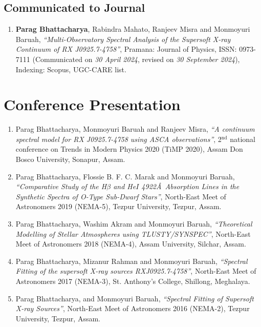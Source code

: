     	\subsection{Communicated to Journal}
    		\begin{enumerate}
    			\item \textbf{Parag Bhattacharya}, Rabindra Mahato, Ranjeev Misra and Monmoyuri Baruah, \textit{``Multi-Observatory Spectral Analysis of the Supersoft X-ray Continuum of RX J0925.7-4758''}, Pramana: Journal of Physics, ISSN: 0973-7111 (Communicated on \textit{30 April 2024}, revised on \textit{30 September 2024}), Indexing: Scopus, UGC-CARE list. \label{paper-pram}
    		\end{enumerate}
    
    \section{Conference Presentation}
        \begin{enumerate}
            \item Parag Bhattacharya, Monmoyuri Baruah and Ranjeev Misra, \textit{``A continuum spectral model for RX J0925.7-4758 using ASCA observations''}, 2$^{\text{nd}}$ national conference on Trends in Modern Physics 2020 (TiMP 2020), Assam Don Bosco University, Sonapur, Assam.
            
            \item Parag Bhattacharya, Flossie B. F. C. Marak and Monmoyuri Baruah, \textit{``Comparative Study of the H$\beta$ and He$I$ 4922\AA\ Absorption Lines in the Synthetic Spectra of O-Type Sub-Dwarf Stars''}, North-East Meet of Astronomers 2019 (NEMA-5), Tezpur University, Tezpur, Assam.
            
            \item Parag Bhattacharya, Washim Akram and Monmoyuri Baruah, \textit{``Theoretical Modelling of Stellar Atmospheres using TLUSTY/SYNSPEC''}, North-East Meet of Astronomers 2018 (NEMA-4), Assam University, Silchar, Assam.
            
            \item Parag Bhattacharya, Mizanur Rahman and Monmoyuri Baruah, \textit{``Spectral Fitting of the supersoft X-ray sources RXJ0925.7-4758''}, North-East Meet of Astronomers 2017 (NEMA-3), St. Anthony's College, Shillong, Meghalaya.
            
            \item Parag Bhattacharya, and Monmoyuri Baruah, \textit{``Spectral Fitting of Supersoft X-ray Sources''}, North-East Meet of Astronomers 2016 (NEMA-2), Tezpur University, Tezpur, Assam.
        \end{enumerate}
        
